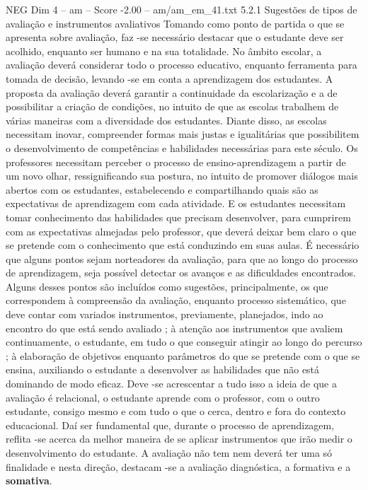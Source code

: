 \begin{textsample}{NEG Dim 4 – am – Score -2.00 – am/am\_em\_41.txt}  \label{ex:f4_neg_184}
5.2.1 Sugestões de tipos de avaliação e instrumentos avaliativos Tomando como ponto de partida o que se apresenta sobre avaliação, faz -se necessário destacar que o estudante deve ser acolhido, enquanto ser humano e na sua totalidade.
No âmbito escolar, a avaliação deverá considerar todo o processo educativo, enquanto ferramenta para tomada de decisão, levando -se em conta a aprendizagem dos estudantes.
A proposta da avaliação deverá garantir a continuidade da escolarização e a de possibilitar a criação de condições, no intuito de que as escolas trabalhem de várias maneiras com a diversidade dos estudantes.
Diante disso, as escolas necessitam inovar, compreender formas mais justas e igualitárias que possibilitem o desenvolvimento de competências e habilidades necessárias para este século.
Os professores necessitam perceber o processo de ensino-aprendizagem a partir de um novo olhar, ressignificando sua postura, no intuito de promover diálogos mais abertos com os estudantes, estabelecendo e compartilhando quais são as expectativas de aprendizagem com cada atividade.
E os estudantes necessitam tomar conhecimento das habilidades que precisam desenvolver, para cumprirem com as expectativas almejadas pelo professor, que deverá deixar bem claro o que se pretende com o conhecimento que está conduzindo em suas aulas.
É necessário que alguns pontos sejam norteadores da avaliação, para que ao longo do processo de aprendizagem, seja possível detectar os avanços e as dificuldades encontrados.
Alguns desses pontos são incluídos como sugestões, principalmente, os que correspondem à compreensão da avaliação, enquanto processo sistemático, que deve contar com variados instrumentos, previamente, planejados, indo ao encontro do que está sendo avaliado ; à atenção aos instrumentos que avaliem continuamente, o estudante, em tudo o que conseguir atingir ao longo do percurso ; à elaboração de objetivos enquanto parâmetros do que se pretende com o que se ensina, auxiliando o estudante a desenvolver as habilidades que não está dominando de modo eficaz.
Deve -se acrescentar a tudo isso a ideia de que a avaliação é relacional, o estudante aprende com o professor, com o outro estudante, consigo mesmo e com tudo o que o cerca, dentro e fora do contexto educacional.
Daí ser fundamental que, durante o processo de aprendizagem, reflita -se acerca da melhor maneira de se aplicar instrumentos que irão medir o desenvolvimento do estudante.
A avaliação não tem nem deverá ter uma só finalidade e nesta direção, destacam -se a avaliação diagnóstica, a formativa e a \textbf{somativa}.

\end{textsample}

